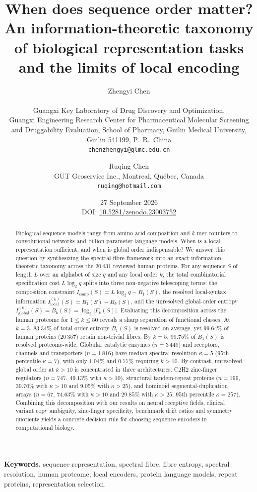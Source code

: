 \documentclass[11pt]{article}
\title{\bfseries When does sequence order matter?\\
An information-theoretic taxonomy of biological representation tasks\\ and the limits of local encoding}
\author{Zhengyi Chen\\[2pt]
\normalsize\begin{tabular}{c}
Guangxi Key Laboratory of Drug Discovery and Optimization,\\
Guangxi Engineering Research Center for Pharmaceutical Molecular Screening\\
and Druggability Evaluation, School of Pharmacy, Guilin Medical University,\\
Guilin 541199, P.~R.~China\\
\texttt{chenzhengyi@glmc.edu.cn}
\end{tabular}
\and
Ruqing Chen\\[2pt]
\normalsize GUT Geoservice Inc., Montreal, Qu\'ebec, Canada\\
\normalsize\texttt{ruqing@hotmail.com}}
\date{27 September 2026\\[4pt]\small DOI: \href{https://doi.org/10.5281/zenodo.23003752}{10.5281/zenodo.23003752}}
\theoremstyle{plain}
\theoremstyle{definition}
\theoremstyle{remark}
\begin{document}
\maketitle

\begin{abstract}
\noindent
Biological sequence models range from amino acid composition and $k$-mer counters to convolutional networks and
billion-parameter language models. When is a local representation sufficient, and when is global order
indispensable? We answer this question by synthesizing the spectral-fibre framework into an exact
information-theoretic taxonomy across the $20\,431$ reviewed human proteins. For any sequence $S$ of length $L$
over an alphabet of size $q$ and any local order $k$, the total combinatorial specification cost $L\log_2 q$
splits into three non-negative telescoping terms: the composition constraint $I_{\mathrm{comp}}(S)=L\log_2 q-B_1(S)$,
the resolved local-syntax information $I_{\mathrm{local}}^{(k)}(S)=B_1(S)-B_k(S)$, and the unresolved global-order
entropy $I_{\mathrm{global}}^{(k)}(S)=B_k(S)=\log_2|F_k(S)|$. Evaluating this decomposition across the human
proteome for $1\le k\le50$ reveals a sharp separation of functional classes. At $k=3$, $83.34\%$ of total order
entropy $B_1(S)$ is resolved on average, yet $99.64\%$ of human proteins ($20\,357$) retain non-trivial fibres.
By $k=5$, $99.75\%$ of $B_1(S)$ is resolved proteome-wide. Globular catalytic enzymes ($n=3\,449$) and
receptors, channels and transporters ($n=1\,816$) have median spectral resolution $\kappa=5$ ($95$th percentile
$\kappa=7$), with only $1.04\%$ and $0.77\%$ requiring $k>10$. By contrast, unresolved global order at $k>10$ is
concentrated in three architectures: C2H2 zinc-finger regulators ($n=747$, $49.13\%$ with $\kappa>10$),
structural tandem-repeat proteins ($n=199$, $39.70\%$ with $\kappa>10$ and $9.05\%$ with $\kappa>25$), and
hominoid segmental-duplication arrays ($n=67$, $74.63\%$ with $\kappa>10$ and $29.85\%$ with $\kappa>25$, $95$th
percentile $\kappa=257$). Combining this decomposition with our results on neural receptive fields, clinical
variant copy ambiguity, zinc-finger specificity, benchmark drift ratios and symmetry quotients yields a concrete
decision rule for choosing sequence encoders in computational biology.
\end{abstract}

\medskip
\noindent\textbf{Keywords.} sequence representation, spectral fibre, fibre entropy, spectral resolution, human
proteome, local encoders, protein language models, repeat proteins, representation selection.
\end{document}
